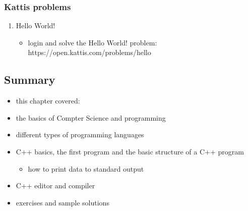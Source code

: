 \documentclass[11pt]{article}
\makeatletter
\providecommand{\tightlist}{%
      \setlength{\itemsep}{0pt}\setlength{\parskip}{0pt}}
\newcommand{\boxspacing}{\kern\kvtcb@left@rule\kern\kvtcb@boxsep}
\newcommand{\prompt}[4]{
        {\ttfamily\llap{{\color{#2}[#3]:\hspace{3pt}#4}}\vspace{-\baselineskip}}
    }
\makeatother
\begin{document}
\hypertarget{kattis-problems}{%
\subsubsection{Kattis problems}\label{kattis-problems}}

\begin{enumerate}
\def\labelenumi{\arabic{enumi}.}
\tightlist
\item
  Hello World!

  \begin{itemize}
  \tightlist
  \item
    login and solve the Hello World! problem:
    https://open.kattis.com/problems/hello
  \end{itemize}
\end{enumerate}

    \hypertarget{summary}{%
\subsection{Summary}\label{summary}}

\begin{itemize}
\tightlist
\item
  this chapter covered:
\item
  the basics of Compter Science and programming
\item
  different types of programming languages
\item
  C++ basics, the first program and the basic structure of a C++ program

  \begin{itemize}
  \tightlist
  \item
    how to print data to standard output
  \end{itemize}
\item
  C++ editor and compiler
\item
  exercises and sample solutions
\end{itemize}

    \begin{tcolorbox}[breakable, size=fbox, boxrule=1pt, pad at break*=1mm,colback=cellbackground, colframe=cellborder]
\prompt{In}{incolor}{ }{\boxspacing}
\begin{Verbatim}[commandchars=\\\{\}]

\end{Verbatim}
\end{tcolorbox}


    
    
    
\end{document}
